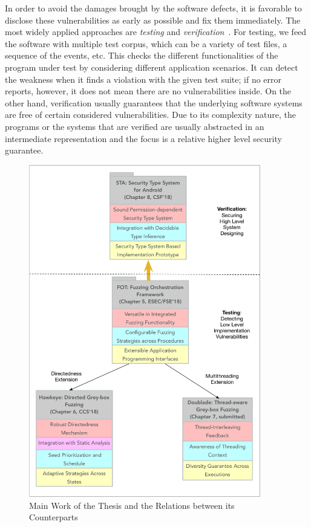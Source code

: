 In order to avoid the damages brought by the software defects, it is favorable to disclose these vulnerabilities as early as possible and fix them immediately. The most widely applied approaches are \emph{testing} and \emph{verification}~\cite{Hailpern:2002:SDT:1660992.1660994,Felderer:2016:MST:2904681.2904685,mc-at}. For testing, we feed the software with multiple test corpus, which can be a variety of test files, a sequence of the events, etc. This checks the different functionalities of the program under test by considering different application scenarios. It can detect the weakness when it finds a violation with the given test suite; if no error reports, however, it does not mean there are no vulnerabilities inside. On the other hand, verification usually guarantees that the underlying software systems are free of certain considered vulnerabilities. Due to its complexity nature, the programs or the systems that are verified are usually abstracted in an intermediate representation and the focus is a relative higher level security guarantee.

\begin{figure}[ht]
	\begin{center}
		\includegraphics[width=0.9\textwidth]{res/contributions}
		\caption{Main Work of the Thesis and the Relations between its Counterparts}
		\label{fig:works}
	\end{center}
\end{figure}


